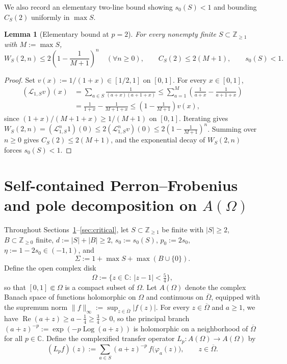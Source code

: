 \documentclass[11pt]{article}
\newtheorem{lemma}[theorem]{Lemma}
\theoremstyle{definition}
\theoremstyle{remark}
\newcommand{\Z}{\mathbb{Z}}
\newcommand{\C}{\mathbb{C}}
\begin{document}
We also record an elementary two-line bound showing $s_0(S)<1$ and bounding
$C_S(2)$ uniformly in $\max S$.

\begin{lemma}[Elementary bound at $p=2$]\label{lem:CS2}
For every nonempty finite $S\subset\Z_{\ge1}$ with $M:=\max S$,
\[
W_S(2,n)\le 2\left(1-\frac{1}{M+1}\right)^n\quad(\forall n\ge0),
\qquad
C_S(2)\le 2(M+1),
\qquad
s_0(S)<1.
\]
\end{lemma}

\begin{proof}
Set $v(x):=1/(1+x)\in[1/2,1]$ on $[0,1]$. For every $x\in[0,1]$,
\begin{align*}
(\mathcal L_{1,S}v)(x)
&=\sum_{a\in S}\frac{1}{(a+x)(a+1+x)}
\le\sum_{a=1}^M\left(\frac{1}{a+x}-\frac{1}{a+1+x}\right)\\
&=\frac{1}{1+x}-\frac{1}{M+1+x}
\le\left(1-\frac{1}{M+1}\right)v(x),
\end{align*}
since $(1+x)/(M+1+x)\ge 1/(M+1)$ on $[0,1]$. Iterating gives
$W_S(2,n)=(\mathcal L_{1,S}^n 1)(0)\le 2(\mathcal L_{1,S}^n v)(0)
\le 2(1-\frac{1}{M+1})^n$. Summing over $n\ge0$ gives $C_S(2)\le 2(M+1)$,
and the exponential decay of $W_S(2,n)$ forces $s_0(S)<1$.
\end{proof}

\section{Self-contained Perron--Frobenius and pole decomposition on \texorpdfstring{$A(\Omega)$}{A(Omega)}}\label{sec:pole}

Throughout Sections~\ref{sec:pole}--\ref{sec:critical}, let
$S\subset\Z_{\ge1}$ be finite with $|S|\ge2$, $B\subset\Z_{\ge0}$ finite,
$d:=|S|+|B|\ge2$, $s_0:=s_0(S)$, $p_0:=2s_0$, $\eta:=1-2s_0\in(-1,1)$, and
\[
\Sigma:=1+\max S+\max(B\cup\{0\}).
\]
Define the open complex disk
\[
\Omega:=\bigl\{z\in\C:\ |z-1|<\tfrac54\bigr\},
\]
so that $[0,1]\Subset\Omega$ is a compact subset of $\Omega$. Let
$A(\Omega)$ denote the complex Banach space of functions holomorphic on
$\Omega$ and continuous on $\overline\Omega$, equipped with the supremum norm
$\|f\|_\infty:=\sup_{z\in\overline\Omega}|f(z)|$. For every $z\in\overline\Omega$
and $a\ge1$, we have $\operatorname{Re}(a+z)\ge a-\frac14\ge\frac34>0$, so
the principal branch $(a+z)^{-p}:=\exp(-p\operatorname{Log}(a+z))$ is
holomorphic on a neighborhood of $\overline\Omega$ for all $p\in\C$. Define
the complexified transfer operator $L_p:A(\Omega)\to A(\Omega)$ by
\begin{equation}\label{eq:Lp-complex}
(L_pf)(z):=\sum_{a\in S}(a+z)^{-p}\,f\bigl(\varphi_a(z)\bigr),
\qquad z\in\overline\Omega.
\end{equation}
\end{document}
